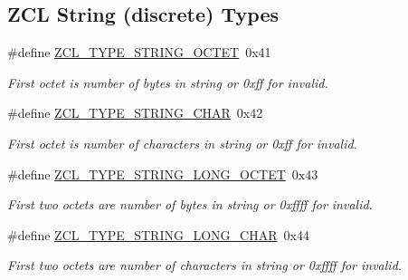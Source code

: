 \subsection*{Z\-C\-L String (discrete) Types}
\begin{DoxyCompactItemize}
\item 
\hypertarget{group__zcl__types_ga7cd063b0a77ca0286b0dcc177e4251c5}{\#define \hyperlink{group__zcl__types_ga7cd063b0a77ca0286b0dcc177e4251c5}{Z\-C\-L\-\_\-\-T\-Y\-P\-E\-\_\-\-S\-T\-R\-I\-N\-G\-\_\-\-O\-C\-T\-E\-T}~0x41}\label{group__zcl__types_ga7cd063b0a77ca0286b0dcc177e4251c5}

\begin{DoxyCompactList}\small\item\em First octet is number of bytes in string or 0xff for invalid. \end{DoxyCompactList}\item 
\#define \hyperlink{group__zcl__types_ga64286e0c69e0ed344a6eb8756ac81f95}{Z\-C\-L\-\_\-\-T\-Y\-P\-E\-\_\-\-S\-T\-R\-I\-N\-G\-\_\-\-C\-H\-A\-R}~0x42
\begin{DoxyCompactList}\small\item\em First octet is number of characters in string or 0xff for invalid. \end{DoxyCompactList}\item 
\#define \hyperlink{group__zcl__types_ga567563a365e2dddaced101de02fd9128}{Z\-C\-L\-\_\-\-T\-Y\-P\-E\-\_\-\-S\-T\-R\-I\-N\-G\-\_\-\-L\-O\-N\-G\-\_\-\-O\-C\-T\-E\-T}~0x43
\begin{DoxyCompactList}\small\item\em First two octets are number of bytes in string or 0xffff for invalid. \end{DoxyCompactList}\item 
\#define \hyperlink{group__zcl__types_gabb23537eaae74cc55233355c6ce5979e}{Z\-C\-L\-\_\-\-T\-Y\-P\-E\-\_\-\-S\-T\-R\-I\-N\-G\-\_\-\-L\-O\-N\-G\-\_\-\-C\-H\-A\-R}~0x44
\begin{DoxyCompactList}\small\item\em First two octets are number of characters in string or 0xffff for invalid. \end{DoxyCompactList}\end{DoxyCompactItemize}
